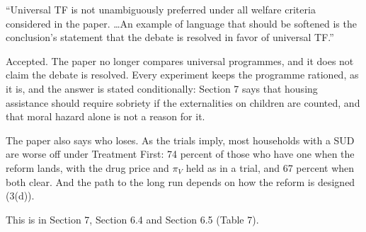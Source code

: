 \documentclass[11pt]{article}
\begin{document}
\begin{referee}
``Universal TF is not unambiguously preferred under all welfare criteria
considered in the paper. \dots An example of language that should be softened is
the conclusion's statement that the debate is resolved in favor of universal TF.''
\end{referee}
\begin{response}
\concede Accepted. The paper no longer compares universal programmes, and it does
not claim the debate is resolved. Every experiment keeps the programme rationed,
as it is, and the answer is stated conditionally: Section 7 says that housing
assistance should require sobriety if the externalities on children are counted,
and that moral hazard alone is not a reason for it.

The paper also says who loses. As the trials imply, most households with a SUD
are worse off under Treatment First: 74 percent of those who have one when the
reform lands, with the drug price and $\pi_V$ held as in a trial, and 67 percent
when both clear. And the path to the long run depends on how the reform is
designed (3(d)).

This is in Section 7, Section 6.4 and Section 6.5 (Table 7).
\end{response}
\end{document}
